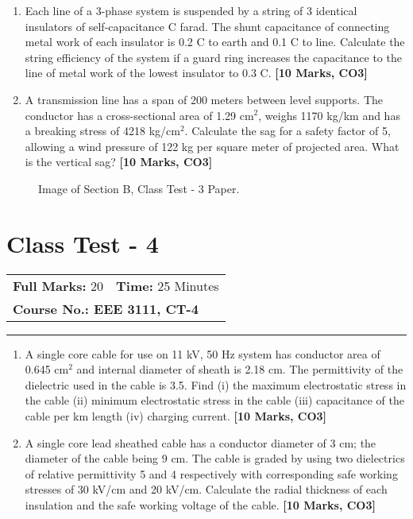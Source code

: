 \documentclass[12pt, a4paper]{article}
\begin{document}
	\begin{enumerate}[label=\textbf{Q.\arabic*}]
		\item Each line of a 3-phase system is suspended by a string of 3 identical insulators of self-capacitance C farad. The shunt capacitance of connecting metal work of each insulator is 0.2 C to earth and 0.1 C to line. Calculate the string efficiency of the system if a guard ring increases the capacitance to the line of metal work of the lowest insulator to 0.3 C. \hfill \textbf{[10 Marks, CO3]}
		
		\item A transmission line has a span of 200 meters between level supports. The conductor has a cross-sectional area of 1.29 cm$^2$, weighs 1170 kg/km and has a breaking stress of 4218 kg/cm$^2$. Calculate the sag for a safety factor of 5, allowing a wind pressure of 122 kg per square meter of projected area. What is the vertical sag? \hfill \textbf{[10 Marks, CO3]}
	\end{enumerate}
	
	\begin{figure}[h!]
		\centering
		\caption{Image of Section B, Class Test - 3 Paper.}
	\end{figure}
	
	\newpage
	
	\section{Class Test - 4}
	\begin{tabular}{ll}
		\textbf{Full Marks:} 20 & \textbf{Time:} 25 Minutes \\
		\multicolumn{2}{l}{\textbf{Course No.: EEE 3111, CT-4}} \\
	\end{tabular}
	\hrule
	\vspace{0.5cm}
	
	\begin{enumerate}[label=\textbf{Q.\arabic*}]
		\item A single core cable for use on 11 kV, 50 Hz system has conductor area of 0.645 cm$^2$ and internal diameter of sheath is 2.18 cm. The permittivity of the dielectric used in the cable is 3.5. Find (i) the maximum electrostatic stress in the cable (ii) minimum electrostatic stress in the cable (iii) capacitance of the cable per km length (iv) charging current. \hfill \textbf{[10 Marks, CO3]}
		
		\item A single core lead sheathed cable has a conductor diameter of 3 cm; the diameter of the cable being 9 cm. The cable is graded by using two dielectrics of relative permittivity 5 and 4 respectively with corresponding safe working stresses of 30 kV/cm and 20 kV/cm. Calculate the radial thickness of each insulation and the safe working voltage of the cable. \hfill \textbf{[10 Marks, CO3]}
	\end{enumerate}
	
\end{document}
